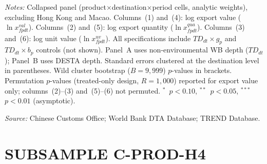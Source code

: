 \documentclass{article}
\begin{document}
\begin{table}[htbp]
\begin{threeparttable}
\begin{tablenotes}[flushleft]
\item \textit{Notes:} Collapsed panel (product$\times$destination$\times$period cells, analytic weights), excluding Hong Kong and Macao. Columns~(1) and~(4): log export value ($\ln x^{val}_{fpdt}$). Columns~(2) and~(5): log export quantity ($\ln x^{qua}_{fpdt}$). Columns~(3) and~(6): log unit value ($\ln x^{uv}_{fpdt}$). All specifications include $TD_{dt} \times g_p$ and $TD_{dt} \times b_p$ controls (not shown). Panel~A uses non-environmental WB depth ($TD_{dt}$); Panel~B uses DESTA depth. Standard errors clustered at the destination level in parentheses. Wild cluster bootstrap ($B = 9{,}999$) $p$-values in brackets. Permutation $p$-values (treated-only design, $R = 1{,}000$) reported for export value only; columns~(2)--(3) and~(5)--(6) not permuted. $^{*}$~$p<0.10$, $^{**}$~$p<0.05$, $^{***}$~$p<0.01$ (asymptotic).
\item \textit{Source:} Chinese Customs Office; World Bank DTA Database; TREND Database.
\end{tablenotes}
\end{threeparttable}
\end{table}

\newpage
\section{SUBSAMPLE C-PROD-H4}
\end{document}
